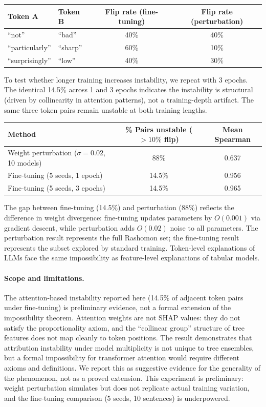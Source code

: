 \documentclass{article}
\begin{document}
\begin{center}
\small
\begin{tabular}{@{}llcc@{}}
\toprule
Token A & Token B & Flip rate (fine-tuning) & Flip rate (perturbation) \\
\midrule
``not'' & ``bad'' & 40\% & 40\% \\
``particularly'' & ``sharp'' & 60\% & 10\% \\
``surprisingly'' & ``low'' & 40\% & 30\% \\
\bottomrule
\end{tabular}
\end{center}

To test whether longer training increases instability, we repeat with 3 epochs. The identical 14.5\% across 1 and 3 epochs indicates the instability is structural (driven by collinearity in attention patterns), not a training-depth artifact. The same three token pairs remain unstable at both training lengths.

\begin{center}
\small
\begin{tabular}{@{}lcc@{}}
\toprule
Method & \% Pairs unstable ($>10\%$ flip) & Mean Spearman \\
\midrule
Weight perturbation ($\sigma{=}0.02$, 10 models) & 88\% & 0.637 \\
Fine-tuning (5 seeds, 1 epoch) & 14.5\% & 0.956 \\
Fine-tuning (5 seeds, 3 epochs) & 14.5\% & 0.965 \\
\bottomrule
\end{tabular}
\end{center}

The gap between fine-tuning (14.5\%) and perturbation (88\%) reflects the difference in weight divergence: fine-tuning updates parameters by $O(0.001)$ via gradient descent, while perturbation adds $O(0.02)$ noise to all parameters. The perturbation result represents the full Rashomon set; the fine-tuning result represents the subset explored by standard training. Token-level explanations of LLMs face the same impossibility as feature-level explanations of tabular models.

\paragraph{Scope and limitations.}
The attention-based instability reported here (14.5\% of adjacent token pairs under fine-tuning) is preliminary evidence, not a formal extension of the impossibility theorem. Attention weights are not SHAP values: they do not satisfy the proportionality axiom, and the ``collinear group'' structure of tree features does not map cleanly to token positions. The result demonstrates that attribution instability under model multiplicity is not unique to tree ensembles, but a formal impossibility for transformer attention would require different axioms and definitions. We report this as suggestive evidence for the generality of the phenomenon, not as a proved extension. This experiment is preliminary: weight perturbation simulates but does not replicate actual training variation, and the fine-tuning comparison (5 seeds, 10 sentences) is underpowered.
\end{document}
